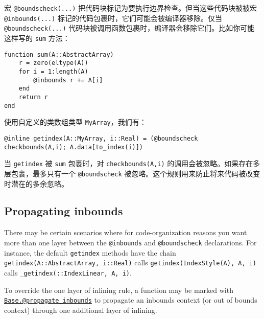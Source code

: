 宏 \texttt{@boundscheck(...)} 把代码块标记为要执行边界检查。但当这些代码块被被宏 \texttt{@inbounds(...)} 标记的代码包裹时，它们可能会被编译器移除。仅当\texttt{@boundscheck(...)} 代码块被调用函数包裹时，编译器会移除它们。比如你可能这样写的 \texttt{sum} 方法： 




\begin{verbatim}
function sum(A::AbstractArray)
    r = zero(eltype(A))
    for i = 1:length(A)
        @inbounds r += A[i]
    end
    return r
end
\end{verbatim}



使用自定义的类数组类型 \texttt{MyArray}，我们有：




\begin{verbatim}
@inline getindex(A::MyArray, i::Real) = (@boundscheck checkbounds(A,i); A.data[to_index(i)])
\end{verbatim}



当 \texttt{getindex} 被 \texttt{sum} 包裹时，对 \texttt{checkbounds(A,i)} 的调用会被忽略。如果存在多层包裹，最多只有一个 \texttt{@boundscheck} 被忽略。这个规则用来防止将来代码被改变时潜在的多余忽略。



\hypertarget{10208484018202603417}{}


\subsection{Propagating inbounds}



There may be certain scenarios where for code-organization reasons you want more than one layer between the \texttt{@inbounds} and \texttt{@boundscheck} declarations. For instance, the default \texttt{getindex} methods have the chain \texttt{getindex(A::AbstractArray, i::Real)} calls \texttt{getindex(IndexStyle(A), A, i)} calls \texttt{\_getindex(::IndexLinear, A, i)}.



To override the {\textquotedbl}one layer of inlining{\textquotedbl} rule, a function may be marked with \hyperlink{4942611866585954207}{\texttt{Base.@propagate\_inbounds}} to propagate an inbounds context (or out of bounds context) through one additional layer of inlining.



\hypertarget{17261866997775737461}{}


